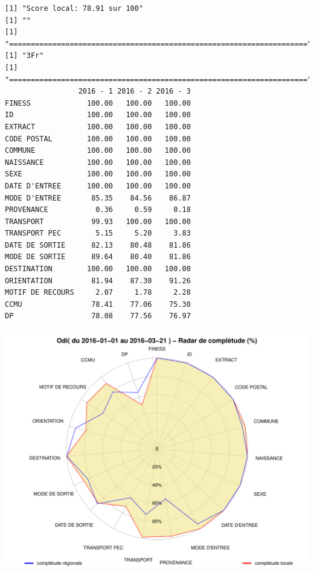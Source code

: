 \documentclass[]{article}
\begin{document}
\begin{verbatim}
[1] "Score local: 78.91 sur 100"
[1] ""
[1] "====================================================================="
[1] "3Fr"
[1] "====================================================================="
                 2016 - 1 2016 - 2 2016 - 3
FINESS             100.00   100.00   100.00
ID                 100.00   100.00   100.00
EXTRACT            100.00   100.00   100.00
CODE POSTAL        100.00   100.00   100.00
COMMUNE            100.00   100.00   100.00
NAISSANCE          100.00   100.00   100.00
SEXE               100.00   100.00   100.00
DATE D'ENTREE      100.00   100.00   100.00
MODE D'ENTREE       85.35    84.56    86.87
PROVENANCE           0.36     0.59     0.18
TRANSPORT           99.93   100.00   100.00
TRANSPORT PEC        5.15     5.20     3.83
DATE DE SORTIE      82.13    80.48    81.86
MODE DE SORTIE      89.64    80.40    81.86
DESTINATION        100.00   100.00   100.00
ORIENTATION         81.94    87.30    91.26
MOTIF DE RECOURS     2.07     1.78     2.28
CCMU                78.41    77.06    75.30
DP                  78.08    77.56    76.97
\end{verbatim}

\includegraphics{completude_files/figure-latex/finess-7.pdf}
\end{document}
